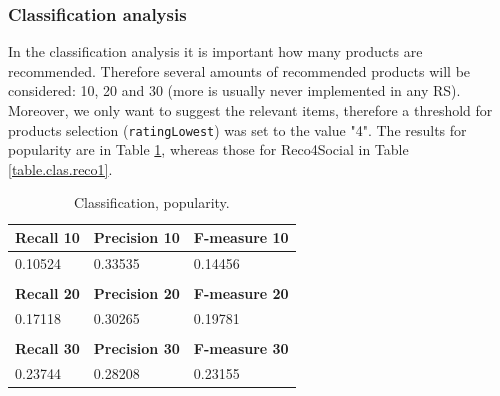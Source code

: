 \documentclass[12pt]{report}
\begin{document}
\subsubsection{Classification analysis}

In the classification analysis it is important how many products are recommended. Therefore several amounts of recommended products will be considered: 10, 20 and 30 (more is usually never implemented in any RS). Moreover, we only want to suggest the relevant items, therefore a threshold for products selection (\texttt{ratingLowest}) was set to the value "4". The results for popularity are in Table \ref{table.clas.popularity1}, whereas those for Reco4Social in Table \ref{table.clas.reco1}.


\begin{table}[htpb]
\centering
\caption{Classification, popularity.}
\label{table.clas.popularity1}
\vspace{3mm}
\begin{tabular}{lll}
\hline
\multicolumn{1}{|l|}{{\bf Recall 10}} & \multicolumn{1}{l|}{{\bf Precision 10}} & \multicolumn{1}{l|}{{\bf F-measure 10}} \\ \hline
\multicolumn{1}{|l|}{0.10524}         & \multicolumn{1}{l|}{0.33535}            & \multicolumn{1}{l|}{0.14456}            \\ \hline
                                      &                                         &                                         \\ \hline
\multicolumn{1}{|l|}{{\bf Recall 20}} & \multicolumn{1}{l|}{{\bf Precision 20}} & \multicolumn{1}{l|}{{\bf F-measure 20}} \\ \hline
\multicolumn{1}{|l|}{0.17118}         & \multicolumn{1}{l|}{0.30265}            & \multicolumn{1}{l|}{0.19781}            \\ \hline
                                      &                                         &                                         \\ \hline
\multicolumn{1}{|l|}{{\bf Recall 30}} & \multicolumn{1}{l|}{{\bf Precision 30}} & \multicolumn{1}{l|}{{\bf F-measure 30}} \\ \hline
\multicolumn{1}{|l|}{0.23744}         & \multicolumn{1}{l|}{0.28208}            & \multicolumn{1}{l|}{0.23155}            \\ \hline
\end{tabular}
\end{table}
\end{document}
